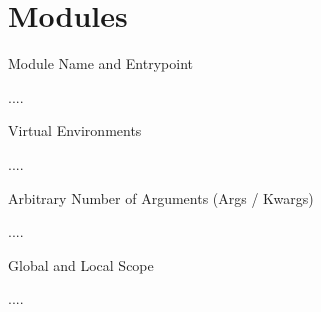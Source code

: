 \documentclass[
	11pt, 
]{beamer}
\begin{document}

\section{Modules}
\begin{frame}[fragile]{Module Name and Entrypoint}

....

\end{frame}


\begin{frame}[fragile]{Virtual Environments}

....

\end{frame}



\begin{frame}[fragile]{Arbitrary Number of Arguments (Args / Kwargs)}

....

\end{frame}



\begin{frame}[fragile]{Global and Local Scope}

....

\end{frame}


\end{document}
